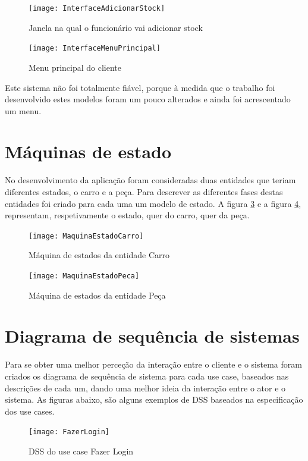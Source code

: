 \documentclass[10pt, a4paper]{report}
\begin{document}
\begin{figure}[!htb]
\centering
\texttt{[image: InterfaceAdicionarStock]}
\caption{Janela na qual o funcionário vai adicionar stock}
\label{Menu AS}
\end{figure}

\begin{figure}[!htb]
\centering
\texttt{[image: InterfaceMenuPrincipal]}
\caption{Menu principal do cliente}
\label{Menu CO}
\end{figure}

\newpage
Este sistema não foi totalmente fiável, porque à medida que o trabalho foi desenvolvido estes modelos foram um pouco alterados e ainda foi acrescentado um menu.


\section{Máquinas de estado}
No desenvolvimento da aplicação foram consideradas duas entidades que teriam diferentes estados, o carro e a peça. Para descrever as diferentes fases destas entidades foi criado para cada uma um modelo de estado. A figura \ref{ME_Carro} e a figura \ref{ME_Peca}, representam, respetivamente o estado, quer do carro, quer da peça.

\begin{figure}[!htb]
\centering
\texttt{[image: MaquinaEstadoCarro]}
\caption{Máquina de estados da entidade Carro}
\label{ME_Carro}
\end{figure}

\begin{figure}[!htb]
\centering
\texttt{[image: MaquinaEstadoPeca]}
\caption{Máquina de estados da entidade Peça}
\label{ME_Peca}
\end{figure}


\section{Diagrama de sequência de sistemas}
Para se obter uma melhor perceção da interação entre o cliente e o sistema foram criados os diagrama de sequência de sistema para cada use case, baseados nas descrições de cada um, dando uma melhor ideia da interação entre o ator e o sistema. As figuras abaixo, são alguns exemplos de DSS baseados na especificação dos use cases.

\begin{figure}[!htb]
\centering
\texttt{[image: FazerLogin]}
\caption{DSS do use case Fazer Login}
\label{DSS FL}
\end{figure}
\end{document}
